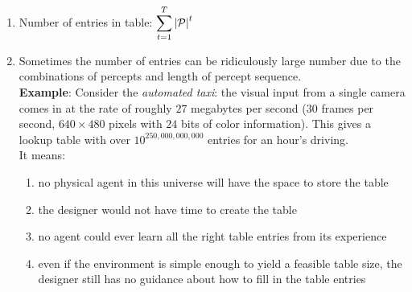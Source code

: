 \begin{enumerate}[itemsep=0.2cm]
    \item Number of entries in table: $
        \displaystyle\sum_{t=1}^T \left| \mathcal{P} \right|^t
    $
    \hfill \cite{ai/book/Artificial-Intelligence-A-Modern-Approach/Russell-Norvig}
    
    \item Sometimes the number of entries can be ridiculously large number due to the combinations of percepts and length of percept sequence.\\
    \textbf{Example}: Consider the \textit{automated taxi}: the visual input from a single camera comes in at the rate of roughly $27$ megabytes per second ($30$ frames per second, $640 \times 480$ pixels with $24$ bits of color information). This gives a lookup table with over $10^{250,000,000,000}$ entries for an hour’s driving.
    \hfill \cite{ai/book/Artificial-Intelligence-A-Modern-Approach/Russell-Norvig}
    \\
    It means:
    \begin{enumerate}
        \item no physical agent in this universe will have the space to store the table
        \hfill \cite{ai/book/Artificial-Intelligence-A-Modern-Approach/Russell-Norvig}

        \item the designer would not have time to create the table
        \hfill \cite{ai/book/Artificial-Intelligence-A-Modern-Approach/Russell-Norvig}

        \item no agent could ever learn all the right table entries from its experience
        \hfill \cite{ai/book/Artificial-Intelligence-A-Modern-Approach/Russell-Norvig}

        \item even if the environment is simple enough to yield a feasible table size, the designer still has no guidance about how to fill in the table entries
        \hfill \cite{ai/book/Artificial-Intelligence-A-Modern-Approach/Russell-Norvig}

    \end{enumerate}
\end{enumerate}

\vspace{0.5cm}

